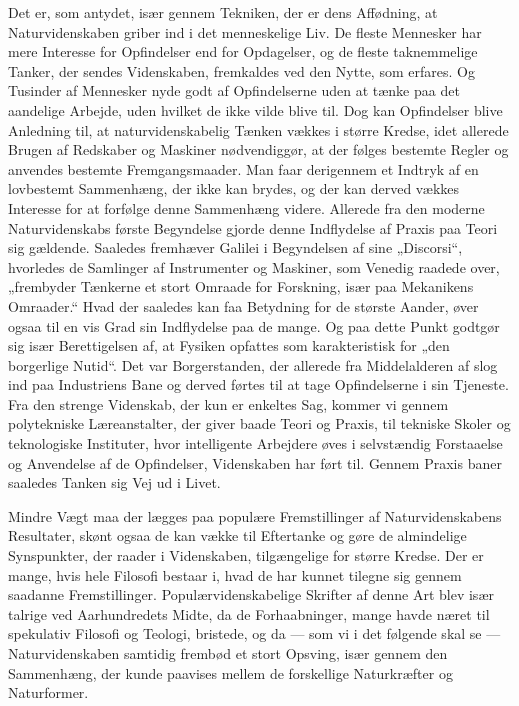\documentclass[12pt,a4paper,openany]{book}
\newcommand{\opage}[1]{\marginnote{\footnotesize\textit{[#1]}}}
\begin{document}
\opage{23}Det er, som antydet, især gennem Tekniken, der er dens Affødning,
at Naturvidenskaben griber ind i det menneskelige Liv. De
fleste Mennesker har mere Interesse for Opfindelser end for Opdagelser,
og de fleste taknemmelige Tanker, der sendes Videnskaben,
fremkaldes ved den Nytte, som erfares. Og Tusinder af Mennesker
nyde godt af Opfindelserne uden at tænke paa det aandelige Arbejde,
uden hvilket de ikke vilde blive til. Dog kan Opfindelser blive Anledning
til, at naturvidenskabelig Tænken vækkes i større Kredse,
idet allerede Brugen af Redskaber og Maskiner nødvendiggør, at der
følges bestemte Regler og anvendes bestemte Fremgangsmaader. Man
faar derigennem et Indtryk af en lovbestemt Sammenhæng, der ikke
kan brydes, og der kan derved vækkes Interesse for at forfølge denne
Sammenhæng videre. Allerede fra den moderne Naturvidenskabs
første Begyndelse gjorde denne Indflydelse af Praxis paa Teori sig
gældende. Saaledes fremhæver Galilei i Begyndelsen af sine „Discorsi“,
hvorledes de Samlinger af Instrumenter og Maskiner, som
Venedig raadede over, „frembyder Tænkerne et stort Omraade for
Forskning, især paa Mekanikens Omraader.“ Hvad der saaledes kan
faa Betydning for de største Aander, øver ogsaa til en vis Grad sin
Indflydelse paa de mange. Og paa dette Punkt godtgør sig især Berettigelsen
af, at Fysiken opfattes som karakteristisk for „den borgerlige
Nutid“. Det var Borgerstanden, der allerede fra Middelalderen
af slog ind paa Industriens Bane og derved førtes til at tage Opfindelserne
i sin Tjeneste. Fra den strenge Videnskab, der kun er
enkeltes Sag, kommer vi gennem polytekniske Læreanstalter, der
giver baade Teori og Praxis, til tekniske Skoler og teknologiske Instituter,
hvor intelligente Arbejdere øves i selvstændig Forstaaelse og
Anvendelse af de Opfindelser, Videnskaben har ført til. Gennem
Praxis baner saaledes Tanken sig Vej ud i Livet.

Mindre Vægt maa der lægges paa populære Fremstillinger af Naturvidenskabens
Resultater, skønt ogsaa de kan vække til Eftertanke
og gøre de almindelige Synspunkter, der raader i Videnskaben, tilgængelige
for større Kredse. Der er mange, hvis hele Filosofi bestaar
i, hvad de har kunnet tilegne sig gennem saadanne Fremstillinger.
Populærvidenskabelige Skrifter af denne Art blev især talrige ved
Aarhundredets Midte, da de Forhaabninger, mange havde næret til
spekulativ Filosofi og Teologi, bristede, og da --- som vi i det følgende
skal se --- Naturvidenskaben samtidig frembød et stort Opsving,
især gennem den Sammenhæng, der kunde paavises mellem
de forskellige Naturkræfter og Naturformer.
\end{document}
